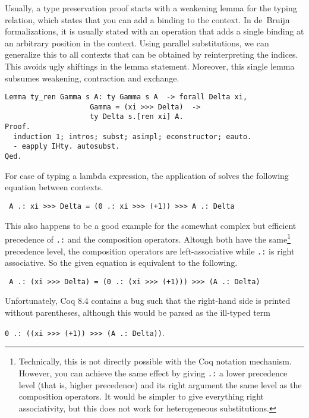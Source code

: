 \documentclass{scrartcl}
\newcommand{\lst}{\lstinline}
\begin{document}
Usually, a type preservation proof starts with a weakening lemma for the typing relation, which states that you can add a binding to the context. 
In de~Bruijn formalizations, it is usually stated with an operation that adds a single binding at an arbitrary position in the context.
Using parallel substitutions, we can generalize this to all contexts that can be obtained by reinterpreting the indices. This avoids ugly shiftings in the lemma statement. Moreover, this single lemma subsumes weakening, contraction and exchange.
\begin{lstlisting}
Lemma ty_ren Gamma s A: ty Gamma s A  -> forall Delta xi, 
                    Gamma = (xi >>> Delta)  ->
                    ty Delta s.[ren xi] A.
Proof.
  induction 1; intros; subst; asimpl; econstructor; eauto. 
  - eapply IHty. autosubst.
Qed.
\end{lstlisting}
For case of typing a lambda expression, the application of \lst@autosubst@ solves the following equation between contexts.
\begin{center}
  \lst$ A .: xi >>> Delta = (0 .: xi >>> (+1)) >>> A .: Delta$
\end{center}
This also happens to be a good example for the somewhat complex but efficient precedence of \lst$.:$ and the composition operators. Altough both have the same\footnote{Technically, this is not directly possible with the Coq notation mechanism. However, you can achieve the same effect by giving \lst$.:$ a lower precedence level (that is, higher precedence) and its right argument the same level as the composition operators. It would be simpler to give everything right associativity, but this does not work for heterogeneous substitutions.} precedence level, the composition operators are left-associative while \lst$.:$ is right associative. So the given equation is equivalent to the following.
\begin{center}
  \lst$ A .: (xi >>> Delta) = (0 .: (xi >>> (+1))) >>> (A .: Delta)$
\end{center}
Unfortunately, Coq 8.4 contains a bug such that the right-hand side is printed without parentheses, although this would be parsed as the ill-typed term 
\begin{center}
  \lst$0 .: ((xi >>> (+1)) >>> (A .: Delta))$.
\end{center}
\end{document}
